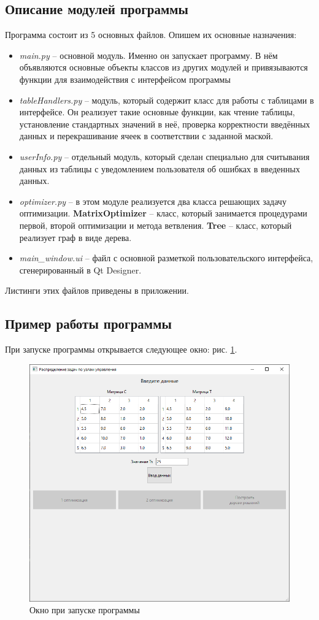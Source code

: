 	\subsection{Описание модулей программы}
	
	Программа состоит из 5 основных файлов. Опишем их основные назначения: 
	\begin{itemize}
		\item \textit{main.py} -- основной модуль. Именно он запускает программу. В нём объявляются основные объекты классов из других модулей и привязываются функции для взаимодействия с интерфейсом программы
		\item \textit{tableHandlers.py} -- модуль, который содержит класс для работы с таблицами в интерфейсе. Он реализует такие основные функции, как чтение таблицы, установление стандартных значений в неё, проверка корректности введённых данных и перекрашивание ячеек в соответствии с заданной маской.
		\item \textit{userInfo.py} -- отдельный модуль, который сделан специально для считывания данных из таблицы с уведомлением пользователя об ошибках в введенных данных. 
		\item \textit{optimizer.py} -- в этом модуле реализуется два класса решающих задачу оптимизации. \textbf{MatrixOptimizer} -- класс, который занимается процедурами первой, второй оптимизации и метода ветвления. \textbf{Tree} -- класс, который реализует граф в виде дерева.
		\item \textit{main\_window.ui} -- файл с основной разметкой пользовательского интерфейса, сгенерированный в Qt Designer.
	\end{itemize}

	Листинги этих файлов приведены в приложении.
	
	\subsection{Пример работы программы}
	
	При запуске программы открывается следующее окно: рис. \ref{prog1}.
	\begin{figure}
		\centering\includegraphics[width=.7\textwidth]{png/prog1.png}
		\caption{Окно при запуске программы}
		\label{prog1}
	\end{figure}

